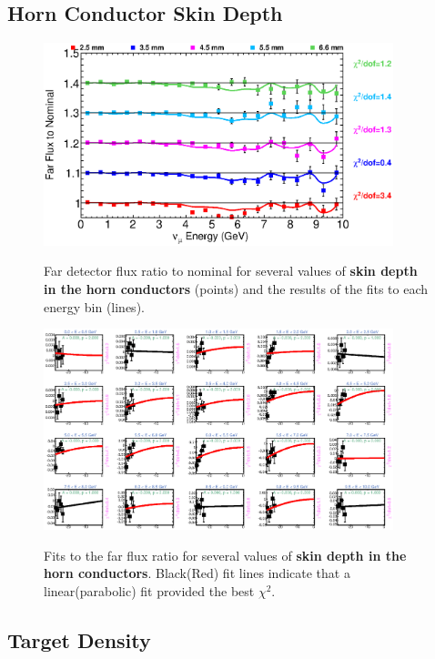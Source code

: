 \clearpage
\subsection{Horn Conductor Skin Depth}

\begin{figure}[ht]
  \begin{center}
    {\includegraphics[width=4.0in]{figures/SkinDepthIC__far_summary.eps}}
  \end{center}
\caption{ Far detector flux ratio to nominal for several values of {\bf skin depth in the horn conductors} (points) and the results of the fits to each energy bin (lines).}
\end{figure}

\begin{figure}[hb]
  \begin{center}
    {\includegraphics[width=4.0in]{figures/SkinDepthIC__far_fits.eps}}
  \end{center}
\caption{ Fits to the far flux ratio for several values of {\bf skin depth in the horn conductors}. Black(Red) fit lines indicate that a linear(parabolic) fit provided the best $\chi^2$. }
\end{figure}

\clearpage
\subsection{Target Density}

